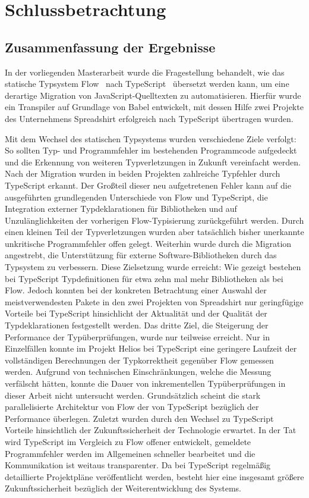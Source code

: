 \chapter{Schlussbetrachtung}
\label{chap:conclusion}

\enlargethispage{\baselineskip}
\section{Zusammenfassung der Ergebnisse}

In der vorliegenden Masterarbeit wurde die Fragestellung behandelt, wie das statische Typsystem Flow~\autocite{FLOW:PAPER} nach TypeScript~\autocite{TYPESCRIPT:SPEC} übersetzt werden kann, um eine derartige Migration von JavaScript-Quelltexten zu automatisieren. Hierfür wurde ein Transpiler auf Grundlage von Babel entwickelt, mit dessen Hilfe zwei Projekte des Unternehmens Spreadshirt erfolgreich nach TypeScript übertragen wurden.

Mit dem Wechsel des statischen Typsystems wurden verschiedene Ziele verfolgt:
So sollten Typ- und Programmfehler im bestehenden Programmcode aufgedeckt und die Erkennung von weiteren Typverletzungen in Zukunft vereinfacht werden. Nach der Migration wurden in beiden Projekten zahlreiche Typfehler durch TypeScript erkannt. Der Großteil dieser neu aufgetretenen Fehler kann auf die ausgeführten grundlegenden Unterschiede von Flow und TypeScript, die Integration externer Typdeklarationen für Bibliotheken und auf Unzulänglichkeiten der vorherigen Flow-Typisierung zurückgeführt werden. Durch einen kleinen Teil der Typverletzungen wurden aber tatsächlich bisher unerkannte unkritische Programmfehler offen gelegt.
Weiterhin wurde durch die Migration angestrebt, die Unterstützung für externe Software-Bibliotheken durch das Typsystem zu verbessern. Diese Zielsetzung wurde erreicht: Wie gezeigt bestehen bei TypeScript Typdefinitionen für etwa zehn mal mehr Bibliotheken als bei Flow. Jedoch konnten bei der konkreten Betrachtung einer Auswahl der meistverwendesten Pakete in den zwei Projekten von Spreadshirt nur geringfügige Vorteile bei TypeScript hinsichlicht der Aktualität und der Qualität der Typdeklarationen festgestellt werden.
Das dritte Ziel, die Steigerung der Performance der Typüberprüfungen, wurde nur teilweise erreicht. Nur in Einzelfällen konnte im Projekt Helios bei TypeScript eine geringere Laufzeit der vollständigen Berechnungen der Typkorrektheit gegenüber Flow gemessen werden. Aufgrund von technischen Einschränkungen, welche die Messung verfälscht hätten, konnte die Dauer von inkrementellen Typüberprüfungen in dieser Arbeit nicht untersucht werden. Grundsätzlich scheint die stark parallelisierte Architektur von Flow der von TypeScript bezüglich der Performance überlegen.
Zuletzt wurden durch den Wechsel zu TypeScript Vorteile hinsichtlich der Zukunftssicherheit der Technologie erwartet. In der Tat wird TypeScript im Vergleich zu Flow offener entwickelt, gemeldete Programmfehler werden im Allgemeinen schneller bearbeitet und die Kommunikation ist weitaus transparenter. Da bei TypeScript regelmäßig detaillierte Projektpläne veröffentlicht werden, besteht hier eine insgesamt größere Zukunftssicherheit bezüglich der Weiterentwicklung des Systems.

